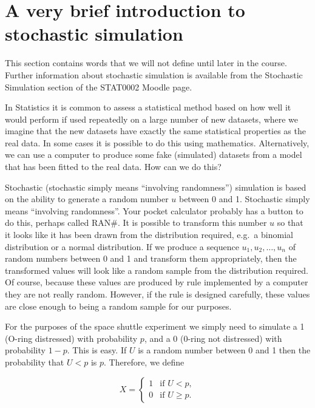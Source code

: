 \documentclass[
  british,
]{book}
\begin{document}
\hypertarget{a-very-brief-introduction-to-stochastic-simulation}{%
\section{A very brief introduction to stochastic simulation}\label{a-very-brief-introduction-to-stochastic-simulation}}

This section contains words that we will not define until later in the course. Further information about stochastic simulation is available from the Stochastic Simulation section of the STAT0002 Moodle page.

In Statistics it is common to assess a statistical method based on how well it would perform if used repeatedly on a large number of new datasets, where we imagine that the new datasets have exactly the same statistical properties as the real data. In some cases it is possible to do this using mathematics. Alternatively, we can use a computer to produce some fake (simulated) datasets from a model that has been fitted to the real data. How can we do this?

Stochastic (stochastic simply means ``involving randomness'') simulation is based on the ability to generate a random number \(u\) between 0 and 1. Stochastic simply means ``involving randomness''. Your pocket calculator probably has a button to do this, perhaps called RAN\#. It is possible to transform this number \(u\) so that it looks like it has been drawn from the distribution required, e.g.~a binomial distribution or a normal distribution. If we produce a sequence \(u_1, u_2, \ldots, u_n\) of random numbers between 0 and 1 and transform them appropriately, then the transformed values will look like a random sample from the distribution required. Of course, because these values are produced by rule implemented by a computer they are not really random. However, if the rule is designed carefully, these values are close enough to being a random sample for our purposes.

For the purposes of the space shuttle experiment we simply need to simulate a 1 (O-ring distressed) with probability \(p\), and a 0 (0-ring not distressed) with probability \(1-p\). This is easy. If \(U\) is a random number between 0 and 1 then the probability that \(U < p\) is \(p\). Therefore, we define

\begin{equation}
X = 
\begin{cases} 
1 & \text{if } U < p, \\
0 & \text{if } U \geq p.
\end{cases}
\label{eq:xbin}
\end{equation}
\end{document}
